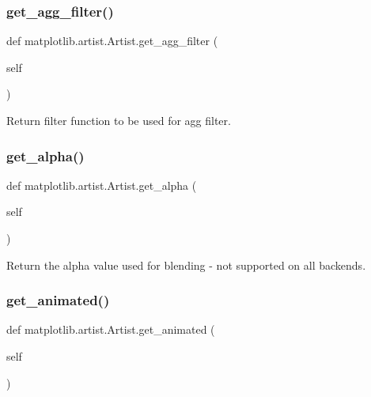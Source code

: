 \subsubsection{\texorpdfstring{get\+\_\+agg\+\_\+filter()}{get\_agg\_filter()}}
{\footnotesize\ttfamily def matplotlib.\+artist.\+Artist.\+get\+\_\+agg\+\_\+filter (\begin{DoxyParamCaption}\item[{}]{self }\end{DoxyParamCaption})}

\begin{DoxyVerb}Return filter function to be used for agg filter.\end{DoxyVerb}
 \mbox{\label{classmatplotlib_1_1artist_1_1Artist_aeaaab64d370d42f0f442e926d70eae87}} 
\subsubsection{\texorpdfstring{get\+\_\+alpha()}{get\_alpha()}}
{\footnotesize\ttfamily def matplotlib.\+artist.\+Artist.\+get\+\_\+alpha (\begin{DoxyParamCaption}\item[{}]{self }\end{DoxyParamCaption})}

\begin{DoxyVerb}Return the alpha value used for blending - not supported on all
backends.
\end{DoxyVerb}
 \mbox{\label{classmatplotlib_1_1artist_1_1Artist_aec40b5ec5650b5640d91d41404b80707}} 
\subsubsection{\texorpdfstring{get\+\_\+animated()}{get\_animated()}}
{\footnotesize\ttfamily def matplotlib.\+artist.\+Artist.\+get\+\_\+animated (\begin{DoxyParamCaption}\item[{}]{self }\end{DoxyParamCaption})}

